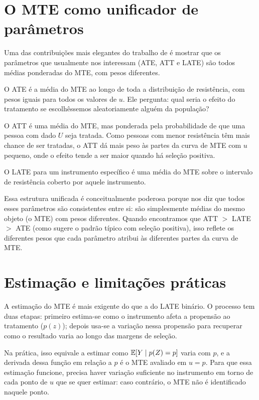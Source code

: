 \section{O MTE como unificador de parâmetros}
\label{sec:mte_unificador}

Uma das contribuições mais elegantes do trabalho de \citet{HeckmanVytlacil2005} é mostrar que os parâmetros que usualmente nos interessam (ATE, ATT e LATE) são todos médias ponderadas do MTE, com pesos diferentes.

O ATE é a média do MTE ao longo de toda a distribuição de resistência, com pesos iguais para todos os valores de $u$. Ele pergunta: qual seria o efeito do tratamento se escolhêssemos aleatoriamente alguém da população?

O ATT é uma média do MTE, mas ponderada pela probabilidade de que uma pessoa com dado $U$ seja tratada. Como pessoas com menor resistência têm mais chance de ser tratadas, o ATT dá mais peso às partes da curva de MTE com $u$ pequeno, onde o efeito tende a ser maior quando há seleção positiva.

O LATE para um instrumento específico é uma média do MTE sobre o intervalo de resistência coberto por aquele instrumento.

Essa estrutura unificada é conceitualmente poderosa porque nos diz que todos esses parâmetros são consistentes entre si: são simplesmente médias do mesmo objeto (o MTE) com pesos diferentes. Quando encontramos que ATT $>$ LATE $>$ ATE (como sugere o padrão típico com seleção positiva), isso reflete os diferentes pesos que cada parâmetro atribui às diferentes partes da curva de MTE.

\section{Estimação e limitações práticas}
\label{sec:mte_estimacao}

A estimação do MTE é mais exigente do que a do LATE binário. O processo tem duas etapas: primeiro estima-se como o instrumento afeta a propensão ao tratamento ($p(z)$); depois usa-se a variação nessa propensão para recuperar como o resultado varia ao longo das margens de seleção.

Na prática, isso equivale a estimar como $\mathbb{E}[Y \mid p(Z) = p]$ varia com $p$, e a derivada dessa função em relação a $p$ é o MTE avaliado em $u = p$. Para que essa estimação funcione, precisa haver variação suficiente no instrumento em torno de cada ponto de $u$ que se quer estimar: caso contrário, o MTE não é identificado naquele ponto.

